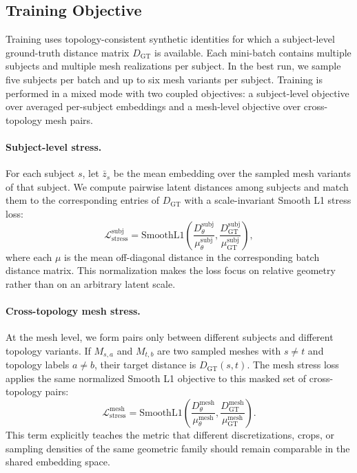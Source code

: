 \documentclass{article}
\begin{document}
\subsection{Training Objective}

Training uses topology-consistent synthetic identities for which a subject-level ground-truth distance matrix $D_{\mathrm{GT}}$ is available. Each mini-batch contains multiple subjects and multiple mesh realizations per subject. In the best run, we sample five subjects per batch and up to six mesh variants per subject. Training is performed in a mixed mode with two coupled objectives: a subject-level objective over averaged per-subject embeddings and a mesh-level objective over cross-topology mesh pairs.

\paragraph{Subject-level stress.}
For each subject $s$, let $\bar{z}_s$ be the mean embedding over the sampled mesh variants of that subject. We compute pairwise latent distances among subjects and match them to the corresponding entries of $D_{\mathrm{GT}}$ with a scale-invariant Smooth L1 stress loss:
\begin{equation}
    \mathcal{L}_{\mathrm{stress}}^{\mathrm{subj}}
    =
    \mathrm{SmoothL1}
    \left(
        \frac{D_\theta^{\mathrm{subj}}}{\mu_\theta^{\mathrm{subj}}},
        \frac{D_{\mathrm{GT}}^{\mathrm{subj}}}{\mu_{\mathrm{GT}}^{\mathrm{subj}}}
    \right),
\end{equation}
where each $\mu$ is the mean off-diagonal distance in the corresponding batch distance matrix. This normalization makes the loss focus on relative geometry rather than on an arbitrary latent scale.

\paragraph{Cross-topology mesh stress.}
At the mesh level, we form pairs only between different subjects and different topology variants. If $M_{s,a}$ and $M_{t,b}$ are two sampled meshes with $s\neq t$ and topology labels $a\neq b$, their target distance is $D_{\mathrm{GT}}(s,t)$. The mesh stress loss applies the same normalized Smooth L1 objective to this masked set of cross-topology pairs:
\begin{equation}
    \mathcal{L}_{\mathrm{stress}}^{\mathrm{mesh}}
    =
    \mathrm{SmoothL1}
    \left(
        \frac{D_\theta^{\mathrm{mesh}}}{\mu_\theta^{\mathrm{mesh}}},
        \frac{D_{\mathrm{GT}}^{\mathrm{mesh}}}{\mu_{\mathrm{GT}}^{\mathrm{mesh}}}
    \right).
\end{equation}
This term explicitly teaches the metric that different discretizations, crops, or sampling densities of the same geometric family should remain comparable in the shared embedding space.
\end{document}

